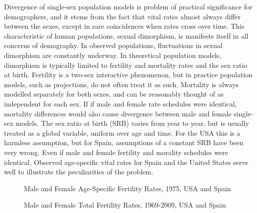 

Divergence of single-sex population models is problem of practical significance
for demographers, and it stems from the fact that vital rates almost always
differ between the sexes, except in rare coincidences when rates cross over
time. This characteristic of human populations, sexual dimorphism,
is manifests itself in all concerns of demography. In observed populations,
fluctuations in sexual dimorphism are constantly underway. In theoretical
population models, dimorphism is typically limited to fertility and mortality
rates and the sex ratio at birth. Fertility is a two-sex interactive phenomenon,
but in practice population models, such as projections, do not often treat it as
such. Mortality is always modelled separately for both sexes, and can
be reasonably thought of as independent for each sex. If if male and female
rate schedules were identical, mortality differences would also
cause divergence between male and female single-sex models. The sex ratio at
birth (SRB) varies from year to year, but is usually treated as a global variable, 
uniform over age and time. For the USA this is a harmless assumption, but for Spain, 
assumptions of a constant SRB have been very wrong. Even if male and female fertility and morality schedules
were identical, Observed age-specific vital rates for Spain and the United
States serve well to illustrate the peculiarities of the problem.  %

\begin{figure}[ht!]
        \centering  
          \caption{Male and Female Age-Specific Fertility Rates, 1975, USA and
          Spain}
          \label{fig:ASFR1975}
\end{figure}


\begin{figure}[ht!]
        \centering  
          \caption{Male and Female Total Fertility Rates, 1969-2009, USA and
          Spain}
          \label{fig:TFRseries}
\end{figure}

